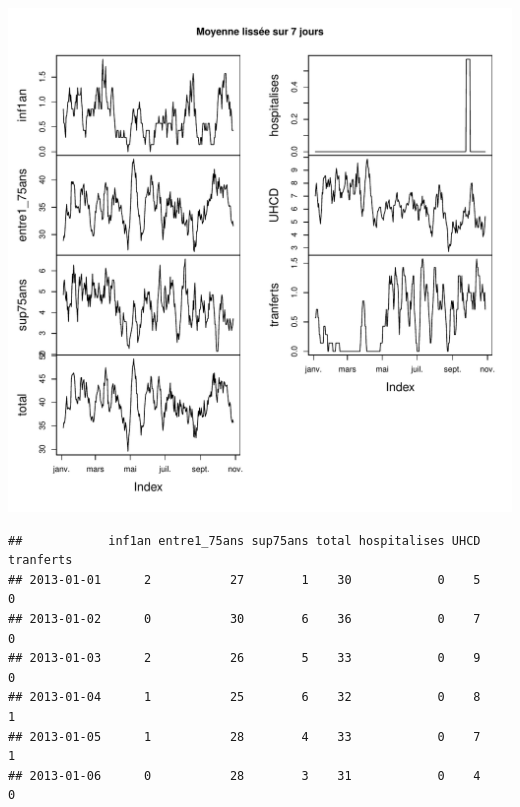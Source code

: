 \documentclass[12pt,english,french,twoside]{report}\usepackage[]{graphicx}\usepackage[]{color}
\makeatletter
\def\maxwidth{ %
  \ifdim\Gin@nat@width>\linewidth
    \linewidth
  \else
    \Gin@nat@width
  \fi
}
\newenvironment{kframe}{%
 \def\at@end@of@kframe{}%
 \ifinner\ifhmode%
  \def\at@end@of@kframe{\end{minipage}}%
  \begin{minipage}{\columnwidth}%
 \fi\fi%
 \def\FrameCommand##1{\hskip\@totalleftmargin \hskip-\fboxsep
 \colorbox{shadecolor}{##1}\hskip-\fboxsep
     \hskip-\linewidth \hskip-\@totalleftmargin \hskip\columnwidth}%
 \MakeFramed {\advance\hsize-\width
   \@totalleftmargin\z@ \linewidth\hsize
   \@setminipage}}%
 {\par\unskip\endMakeFramed%
 \at@end@of@kframe}
\newenvironment{knitrout}{}{} %
\makeatother
\begin{document}
\begin{knitrout}
\begin{kframe}
{\ttfamily\noindent\bfseries\color{errorcolor}{\#\# Error: Can't plot lines for multivariate zoo object}}\end{kframe}
\includegraphics[width=\maxwidth]{figure/stAnne_tx_moyen_passages2} 
\begin{kframe}\begin{verbatim}
##            inf1an entre1_75ans sup75ans total hospitalises UHCD tranferts
## 2013-01-01      2           27        1    30            0    5         0
## 2013-01-02      0           30        6    36            0    7         0
## 2013-01-03      2           26        5    33            0    9         0
## 2013-01-04      1           25        6    32            0    8         1
## 2013-01-05      1           28        4    33            0    7         1
## 2013-01-06      0           28        3    31            0    4         0
\end{verbatim}
\end{kframe}

\end{knitrout}
\end{document}
